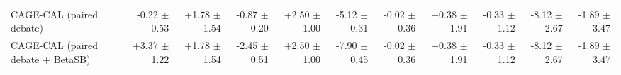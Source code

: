 \begin{tabular}{lrrrrrrrrrr}
CAGE-CAL (paired debate) & -0.22 {\scriptsize $\pm$ 0.53} & +1.78 {\scriptsize $\pm$ 1.54} & -0.87 {\scriptsize $\pm$ 0.20} & +2.50 {\scriptsize $\pm$ 1.00} & -5.12 {\scriptsize $\pm$ 0.31} & -0.02 {\scriptsize $\pm$ 0.36} & +0.38 {\scriptsize $\pm$ 1.91} & -0.33 {\scriptsize $\pm$ 1.12} & -8.12 {\scriptsize $\pm$ 2.67} & -1.89 {\scriptsize $\pm$ 3.47} \\
CAGE-CAL (paired debate + BetaSB) & +3.37 {\scriptsize $\pm$ 1.22} & +1.78 {\scriptsize $\pm$ 1.54} & -2.45 {\scriptsize $\pm$ 0.51} & +2.50 {\scriptsize $\pm$ 1.00} & -7.90 {\scriptsize $\pm$ 0.45} & -0.02 {\scriptsize $\pm$ 0.36} & +0.38 {\scriptsize $\pm$ 1.91} & -0.33 {\scriptsize $\pm$ 1.12} & -8.12 {\scriptsize $\pm$ 2.67} & -1.89 {\scriptsize $\pm$ 3.47} \\
\bottomrule
\end{tabular}

